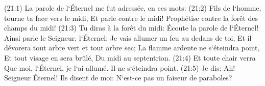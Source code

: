 \verse (21:1) La parole de l`Éternel me fut adressée, en ces mots: 
\verse (21:2) Fils de l`homme, tourne ta face vers le midi, Et parle contre le midi! Prophétise contre la forêt des champs du midi! 
\verse (21:3) Tu diras à la forêt du midi: Écoute la parole de l`Éternel! Ainsi parle le Seigneur, l`Éternel: Je vais allumer un feu au dedans de toi, Et il dévorera tout arbre vert et tout arbre sec; La flamme ardente ne s`éteindra point, Et tout visage en sera brûlé, Du midi au septentrion. 
\verse (21:4) Et toute chair verra Que moi, l`Éternel, je l`ai allumé. Il ne s`éteindra point. 
\verse (21:5) Je dis: Ah! Seigneur Éternel! Ils disent de moi: N`est-ce pas un faiseur de paraboles? 

\chapter{}

